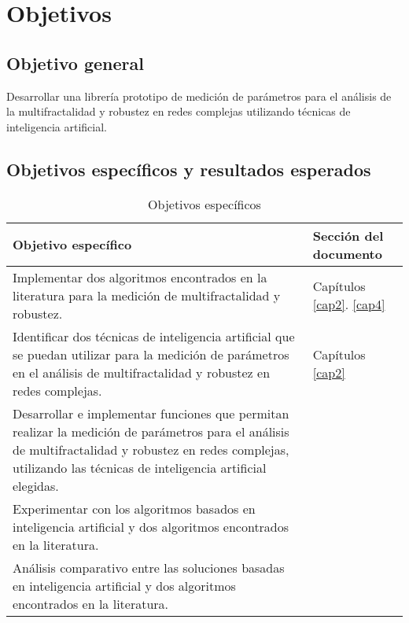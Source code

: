 \section{Objetivos}

\subsection{Objetivo general}

Desarrollar una librería prototipo de medición de parámetros para el análisis de la multifractalidad y robustez en redes complejas utilizando técnicas de inteligencia artificial.

\subsection{Objetivos espec\'ificos y resultados esperados}

\begin{table}[H]
    \centering
    \begin{tabular}{|p{11cm}|p{4cm}|}
        \hline
        \textbf{Objetivo específico} & \textbf{Sección del documento} \\
        \hline
        Implementar dos algoritmos encontrados en la literatura para la medición de multifractalidad y robustez.& Capítulos \ref{cap2}. \ref{cap4}\\
        \hline
        Identificar dos técnicas de inteligencia artificial que se puedan utilizar para la medición de parámetros en el análisis de multifractalidad y robustez en redes complejas.&  Capítulos \ref{cap2}\\
        \hline
         Desarrollar e implementar funciones que
permitan realizar la medición de parámetros para el análisis de multifractalidad y robustez en redes complejas, utilizando las técnicas de inteligencia artificial elegidas. & \\
        \hline
         Experimentar con los algoritmos basados
en inteligencia artificial y dos algoritmos
encontrados en la literatura.&  \\
        \hline
        Análisis comparativo entre las soluciones basadas en inteligencia artificial y dos algoritmos encontrados en la literatura.  & \\
        \hline
    \end{tabular}
    \caption{Objetivos específicos}
    \label{tab:objEspecificos}
\end{table}







